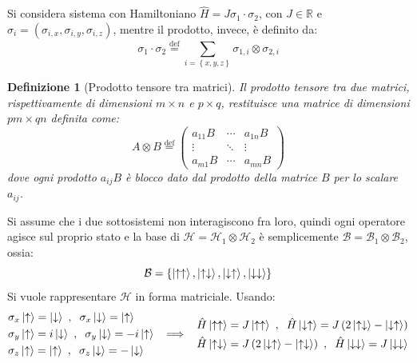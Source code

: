 \documentclass[10pt, a4paper]{scrartcl} %
\numberwithin{equation}{subsection}
\theoremstyle{style2}
\theoremstyle{style1}
\newtheorem{definizione}{Definizione}[section]
\begin{document}
Si considera sistema con Hamiltoniano $\hat{H} = J \sigma _1 \cdot \sigma _2$, con $J \in \mathbb{R}$ e $\sigma _i = (\sigma _{i,x} , \sigma _{i,y} , \sigma _{i,z} )$, mentre il prodotto, invece, \`e definito da:
\begin{equation}
	\sigma _1 \cdot \sigma _2 \overset{\text{def}}{=} \sum_{i=\left\{ x,y,z \right\} }^{} \sigma _{1,i} \otimes \sigma _{2,i} 
\end{equation}
\begin{definizione}[Prodotto tensore tra matrici]
	Il prodotto tensore tra due matrici, rispettivamente di dimensioni $m \times n$ e $p \times q$, restituisce una matrice di dimensioni $pm  \times  qn$ definita come:
	\begin{equation}
		A \otimes B \overset{\text{def}}{=} \begin{pmatrix} a_{11} B & \cdots & a_{1n} B\\ \vdots & \ddots&\vdots \\ a_{m1}B & \cdots  & a_{mn} B\end{pmatrix} 
	\end{equation}
	dove ogni prodotto $a_{ij} B$ \`e blocco dato dal prodotto della matrice $B$ per lo scalare $a_{ij} $. 
\end{definizione}
\noindent Si assume che i due sottosistemi non interagiscono fra loro, quindi ogni operatore agisce sul proprio stato e la base di $\mathcal{H} = \mathcal{H}_1 \otimes \mathcal{H}_2$ \`e semplicemente $\mathcal{B} = \mathcal{B}_1 \otimes \mathcal{B}_2$, ossia:
\begin{equation}
	\mathcal{B} = \left\{ \ket{\uparrow \uparrow} , \ket{\uparrow \downarrow} , \ket{\downarrow \uparrow}, \ket{\downarrow \downarrow}   \right\} 
\end{equation}
Si vuole rappresentare $\mathcal{H}$ in forma matriciale. Usando:
\begin{equation}\label{pupd}
\begin{split}
	&\sigma _x \ket{\uparrow} = \ket{\downarrow} \ , \hspace{.2cm} \sigma _x \ket{\downarrow} = \ket{\uparrow} \\
	&\sigma _y \ket{\uparrow} = i\ket{\downarrow} \ , \hspace{.2cm} \sigma _y \ket{\downarrow} = -i \ket{\uparrow} \\
	&\sigma _z \ket{\uparrow} = \ket{\uparrow} \ , \hspace{.2cm} \sigma _z \ket{\downarrow} = -\ket{\downarrow}
	\end{split} \hspace{.2cm}\implies\hspace{.2cm} \begin{split}
	&\hat{ H} \ket{\uparrow \uparrow} = J \ket{\uparrow \uparrow}\ , \hspace{.2cm}\hat{H} \ket{\downarrow \uparrow} = J \left(2 \ket{\uparrow\downarrow} - \ket{\downarrow \uparrow} \right) \\
	&\hat{ H} \ket{\uparrow \downarrow} = J \left(2 \ket{\downarrow \uparrow} - \ket{\uparrow \downarrow} \right) \ , \hspace{.2cm}  \hat{H} \ket{\downarrow \downarrow} = J \ket{\downarrow \downarrow} 
\end{split}
\end{equation}
\end{document}
